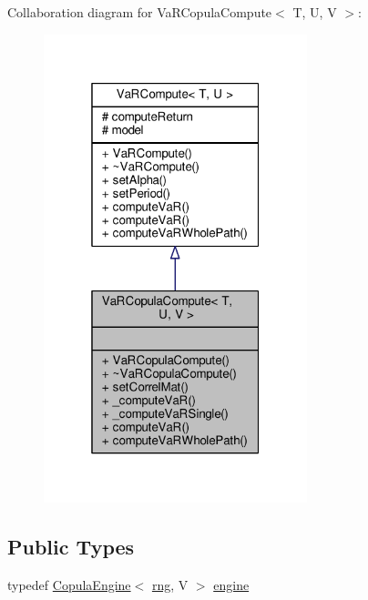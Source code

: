 Collaboration diagram for Va\+R\+Copula\+Compute$<$ T, U, V $>$\+:
\nopagebreak
\begin{figure}[H]
\begin{center}
\leavevmode
\includegraphics[width=217pt]{classVaRCopulaCompute__coll__graph}
\end{center}
\end{figure}
\subsection*{Public Types}
\begin{DoxyCompactItemize}
\item 
typedef \hyperlink{classCopulaEngine}{Copula\+Engine}$<$ \hyperlink{classrng}{rng}, V $>$ \hyperlink{classVaRCopulaCompute_a72e41ad9fcb5880aac35affa027f2e3d}{engine}
\end{DoxyCompactItemize}
